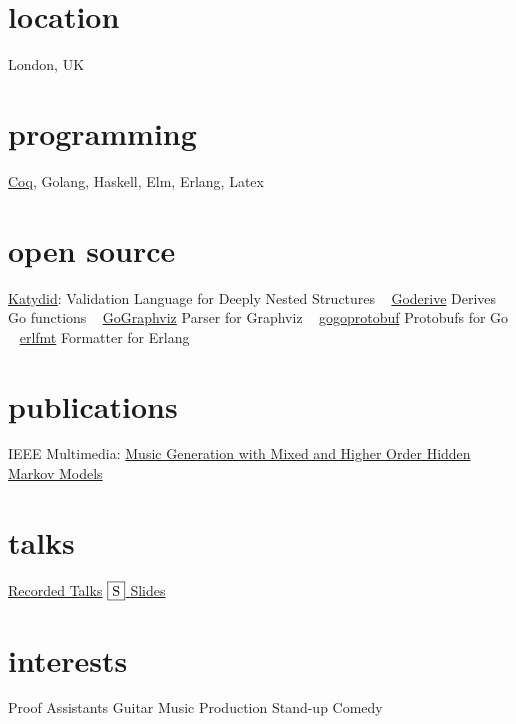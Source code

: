 \documentclass[print]{friggeri-cv-a4} %
\begin{document}

\begin{aside} %
\section{location}
London, UK
\section{programming}
\href{https://coq.inria.fr/}{Coq}, Golang, Haskell, Elm, Erlang, Latex
\section{open source}
\href{https://github.com/katydid/katydid}{Katydid}:
Validation Language for Deeply Nested Structures
~
\href{https://github.com/awalterschulze/goderive}{Goderive} 
Derives Go functions
~
\href{https://github.com/awalterschulze/gographviz}{GoGraphviz} 
Parser for Graphviz
~
\href{https://github.com/gogo/protobuf}{gogoprotobuf} 
Protobufs for Go 
~
\href{https://github.com/WhatsApp/erlfmt}{erlfmt}  
Formatter for Erlang
\section{publications}
IEEE Multimedia: \href{http://doi.ieeecomputersociety.org/10.1109/MMUL.2010.44}{Music Generation with Mixed and Higher Order Hidden Markov Models}
\section{talks}
\href{https://www.youtube.com/playlist?list=PLYwF9EIrl42T3ml_ANaNifOuTQtLxaZgQ}{\faYoutubePlay Recorded Talks}
\href{https://slides.com/awalterschulze}{$\fbox{S}$ Slides}
\section{interests}
Proof Assistants
Guitar
Music Production
Stand-up Comedy
\end{aside}
\end{document}
